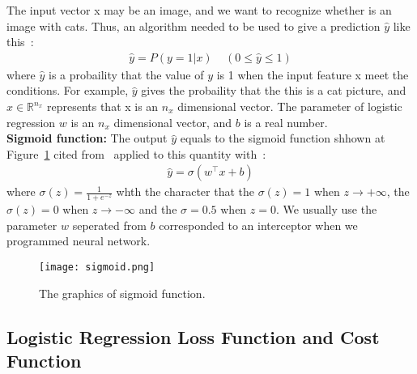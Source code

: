 \documentclass[a4paper]{article}
\begin{document}
The input vector x may be an image, and we want to recognize whether is an image with cats. Thus, an algorithm needed to be used to give a prediction $\hat{y}$ like this~\cite{Neural}:\\
\begin{gather}
\hat{y} = P(y = 1|x)~~~~~(0 \le \hat{y} \le 1)
\end{gather}
where $\hat{y}$ is a probaility that the value of $y$ is 1 when the input feature x meet the conditions. For example, $\hat{y}$ gives the probaility that the this is a cat picture, and $x\in \mathbb{R}^{n_x}$ represents that x is an $n_x$ dimensional vector. The parameter of logistic regression $w$ is an $n_x$ dimensional vector, and $b$ is a real number.\\ 
{\bf Sigmoid function:} The output $\hat{y}$ equals to the sigmoid function shhown at Figure~\ref{fig2} cited from~\cite{Neural} applied to this quantity with~\cite{Neural}:\\
\begin{gather}
\hat{y} = \sigma(w^\top x + b)
\label{1}
\end{gather}
where $\sigma(z) = \frac{1}{1 + e^{-z}}$ whth the character that the $\sigma(z) = 1$ when $z \to +\infty$, the $\sigma(z) = 0$ when $z \to -\infty$ and the $\sigma = 0.5$ when $z = 0$. We usually use the parameter $w$ seperated from $b$ corresponded to an interceptor when we programmed neural network.
\begin{figure}[hb]
\centering
\texttt{[image: sigmoid.png]}
\caption{The graphics of sigmoid function.}
\label{fig2}
\end{figure} 

\subsection{Logistic Regression Loss Function and Cost Function}
\end{document}
